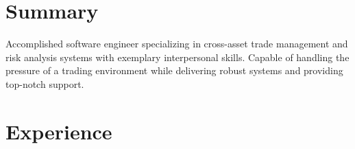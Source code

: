 \documentclass[11pt,a4paper,sans]{moderncv}
\begin{document}
\makecvtitle

\section{Summary}
Accomplished software engineer specializing in cross-asset trade management and risk analysis systems with exemplary interpersonal skills. Capable of handling the pressure of a trading environment while delivering robust systems and providing top-notch support.

\section{Experience}
\end{document}
